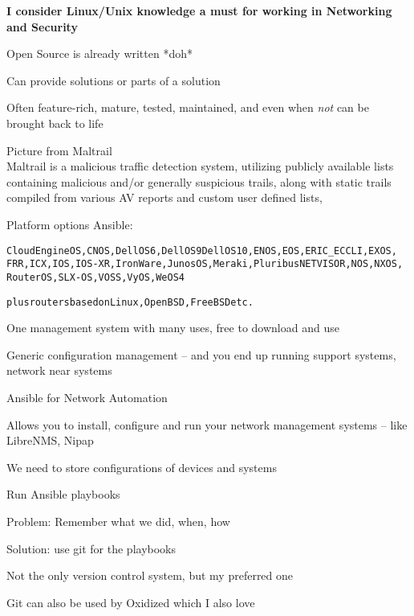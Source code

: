 \documentclass[Screen16to9,17pt]{foils}
\begin{document}
{\bf I consider Linux/Unix knowledge a must for working in Networking and Security}



\begin{list2}
\item Open Source is already written *doh*
\item Can provide solutions or parts of a solution
\item Often feature-rich, mature, tested, maintained, and even when \emph{not} can be brought back to life
\item Picture from Maltrail \\
Maltrail is a malicious traffic detection system, utilizing publicly available lists containing malicious and/or generally suspicious trails, along with static trails compiled from various AV reports and custom user defined lists,
\end{list2}






Platform options Ansible:
\begin{alltt}
CloudEngine OS, CNOS, Dell OS6, Dell OS9 Dell OS10, ENOS, EOS, ERIC_ECCLI, EXOS,
FRR, ICX, IOS, IOS-XR, IronWare, Junos OS, Meraki, Pluribus NETVISOR, NOS, NXOS,
RouterOS, SLX-OS, VOSS, VyOS, WeOS 4

plus routers based on Linux, OpenBSD, FreeBSD etc.
\end{alltt}


One management system with many uses, free to download and use
\begin{list2}
\item Generic configuration management -- and you end up running support systems, network near systems
\item Ansible for Network Automation\\
\item Allows you to install, configure and run your network management systems -- like LibreNMS, Nipap
\end{list2}



\begin{list2}
\item We need to store configurations of devices and systems
\item Run Ansible playbooks
\item Problem: Remember what we did, when, how
\item Solution: use git for the playbooks
\item Not the only version control system, but my preferred one
\item Git can also be used by Oxidized which I also love 
\end{list2}
\end{document}
